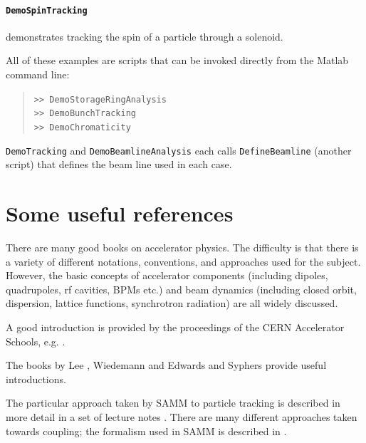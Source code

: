 \documentclass[11pt,twoside,a4paper]{article}
\begin{document}
\paragraph{\texttt{DemoSpinTracking}} demonstrates tracking the spin of a particle
through a solenoid.
\vspace{0.2in}

All of these examples are scripts that can be invoked directly from
the Matlab command line:
\begin{quote}
\texttt{>> DemoStorageRingAnalysis \\
>> DemoBunchTracking \\
>> DemoChromaticity}
\end{quote}

\texttt{DemoTracking} and \texttt{DemoBeamlineAnalysis} each calls
\texttt{DefineBeamline} (another script) that defines the beam line used in
each case.

\section{Some useful references}

There are many good books on accelerator physics.  The difficulty is that
there is a variety of different notations, conventions, and approaches used
for the subject.  However, the basic concepts of accelerator components
(including dipoles, quadrupoles, rf cavities, BPMs etc.) and beam dynamics
(including closed orbit, dispersion, lattice functions, synchrotron
radiation) are all widely discussed.

A good introduction is provided by the proceedings of the CERN Accelerator
Schools, e.g. \cite{cite:CAS1994}.

The books by Lee \cite{cite:lee}, Wiedemann \cite{cite:wiedemann} and
Edwards and Syphers \cite{cite:edwardssyphers} provide useful introductions.

The particular approach taken by SAMM to particle tracking is described in
more detail in a set of lecture notes \cite{cite:wolski1, cite:wolski2}.
There are many different approaches taken towards coupling; the formalism
used in SAMM is described in \cite{cite:wolski3}.
\end{document}
